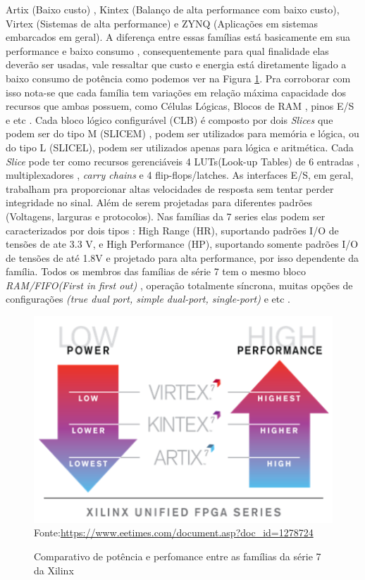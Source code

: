 Artix (Baixo custo) , Kintex (Balanço de alta performance com baixo custo), Virtex (Sistemas de alta performance) e ZYNQ (Aplicações em sistemas embarcados em geral).
A diferença entre essas famílias está basicamente em sua performance e baixo consumo , consequentemente para qual finalidade elas deverão ser usadas, vale ressaltar que custo e energia está diretamente ligado a baixo consumo de potência como podemos ver na Figura \ref{comparative}. Pra corroborar com isso nota-se que cada família tem variações em relação máxima capacidade dos recursos que ambas possuem, como Células Lógicas, Blocos de RAM , pinos E/S e etc .
Cada bloco lógico configurável (CLB) é composto por dois \textit{Slices} que podem ser do tipo M (SLICEM) , podem ser utilizados para memória e lógica, ou do tipo L (SLICEL), podem ser utilizados apenas para lógica e aritmética. 
Cada \textit{Slice} pode ter como recursos gerenciáveis 4 LUTs(Look-up Tables) de 6 entradas , multiplexadores , \textit{carry chains} e 4 flip-flops/latches.
As interfaces E/S, em geral, trabalham pra proporcionar altas velocidades de resposta sem tentar perder integridade no sinal. Além de serem projetadas para diferentes padrões (Voltagens, larguras e protocolos). Nas famílias da 7 series elas podem ser caracterizados por dois tipos : High Range (HR), suportando padrões I/O de tensões de ate 3.3 V,  e High Performance (HP), suportando somente padrões I/O de tensões de até 1.8V e projetado para alta performance, por isso dependente da família.
Todos os membros das famílias de série 7 tem o mesmo bloco \textit{RAM/FIFO(First in first out)} , operação totalmente síncrona, muitas opções de configurações \textit{(true dual port, simple dual-port, single-port)} e etc \cite{demetrioarquitetura}. 

\begin{figure}[H]
	\centering
	\caption{Comparativo de potência e perfomance entre as famílias da série 7 da Xilinx}
	\includegraphics[width=12cm]{figures/xi-lite-01.png}
	{Fonte:\url{https://www.eetimes.com/document.asp?doc_id=1278724}}
	\label{comparative}
\end{figure}